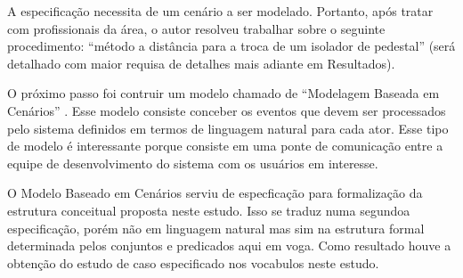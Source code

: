 A especificação necessita de um cenário a ser modelado. Portanto, após tratar com profissionais da área, o autor resolveu trabalhar sobre o seguinte procedimento: ``método a distância para a troca de um isolador de pedestal'' (será detalhado com maior requisa de detalhes mais adiante em Resultados).

O próximo passo foi contruir um modelo chamado de ``Modelagem Baseada em Cenários'' \cite{softwareeng}. Esse modelo consiste conceber os eventos que devem ser processados pelo sistema definidos em termos de linguagem natural para cada ator. Esse tipo de modelo é interessante porque consiste em uma ponte de comunicação entre a equipe de desenvolvimento do sistema com os usuários em interesse.     

O Modelo Baseado em Cenários serviu de especficação para formalização da estrutura conceitual proposta neste estudo. Isso se traduz numa segundoa especificação, porém não em linguagem natural mas sim na estrutura formal determinada pelos conjuntos e predicados aqui em voga. Como resultado houve a obtenção do estudo de caso especificado nos vocabulos neste estudo.